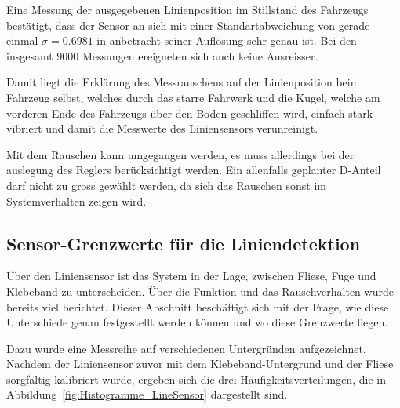 \documentclass[main.tex]{subfiles} %
\begin{document}
Eine Messung der ausgegebenen Linienposition im Stillstand des Fahrzeugs
bestätigt, dass der Sensor an sich mit einer Standartabweichung von gerade
einmal $\sigma = 0.6981$ in anbetracht seiner Auflösung sehr genau ist. Bei den
insgesamt $9000$ Messungen ereigneten sich auch keine Ausreisser.

Damit liegt die Erklärung des Messrauschens auf der Linienposition beim
Fahrzeug selbst, welches durch das starre Fahrwerk und die Kugel, welche am
vorderen Ende des Fahrzeugs über den Boden geschliffen wird, einfach stark
vibriert und damit die Messwerte des Liniensensors verunreinigt.

Mit dem Rauschen kann umgegangen werden, es muss allerdings bei der auslegung
des Reglers berücksichtigt werden. Ein allenfalls geplanter D-Anteil darf nicht
zu gross gewählt werden, da sich das Rauschen sonst im Systemverhalten zeigen
wird.

\subsection*{Sensor-Grenzwerte für die Liniendetektion}\label{apdx:Liniensensor_Liniendetektion}

Über den Liniensensor ist das System in der Lage, zwischen Fliese, Fuge und Klebeband
zu unterscheiden. Über die Funktion und das Rauschverhalten wurde bereits viel
berichtet. Dieser Abschnitt beschäftigt sich mit der Frage, wie diese Unterschiede genau
festgestellt werden können und wo diese Grenzwerte liegen.

Dazu wurde eine Messreihe auf verschiedenen Untergründen aufgezeichnet. Nachdem
der Liniensensor zuvor mit dem Klebeband-Untergrund und der Fliese sorgfältig
kalibriert wurde, ergeben sich die drei Häufigkeitsverteilungen, die in
Abbildung~\ref{fig:Histogramme_LineSensor} dargestellt sind.
\end{document}
